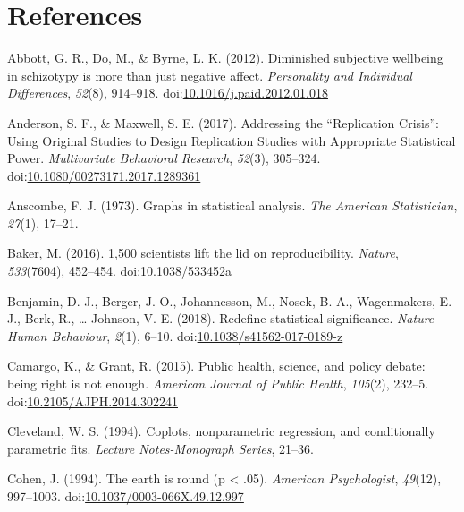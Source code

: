 \documentclass[
  doc]{apa6}
\begin{document}
\hypertarget{references}{%
\section{References}\label{references}}

\begingroup
\setlength{\parindent}{-0.5in}
\setlength{\leftskip}{0.5in}

\hypertarget{refs}{}
\leavevmode\hypertarget{ref-Abbott2012}{}%
Abbott, G. R., Do, M., \& Byrne, L. K. (2012). Diminished subjective wellbeing in schizotypy is more than just negative affect. \emph{Personality and Individual Differences}, \emph{52}(8), 914--918. doi:\href{https://doi.org/10.1016/j.paid.2012.01.018}{10.1016/j.paid.2012.01.018}

\leavevmode\hypertarget{ref-Anderson2017}{}%
Anderson, S. F., \& Maxwell, S. E. (2017). Addressing the ``Replication Crisis'': Using Original Studies to Design Replication Studies with Appropriate Statistical Power. \emph{Multivariate Behavioral Research}, \emph{52}(3), 305--324. doi:\href{https://doi.org/10.1080/00273171.2017.1289361}{10.1080/00273171.2017.1289361}

\leavevmode\hypertarget{ref-anscombe1973graphs}{}%
Anscombe, F. J. (1973). Graphs in statistical analysis. \emph{The American Statistician}, \emph{27}(1), 17--21.

\leavevmode\hypertarget{ref-Baker2016a}{}%
Baker, M. (2016). 1,500 scientists lift the lid on reproducibility. \emph{Nature}, \emph{533}(7604), 452--454. doi:\href{https://doi.org/10.1038/533452a}{10.1038/533452a}

\leavevmode\hypertarget{ref-Benjamin2018}{}%
Benjamin, D. J., Berger, J. O., Johannesson, M., Nosek, B. A., Wagenmakers, E.-J., Berk, R., \ldots{} Johnson, V. E. (2018). Redefine statistical significance. \emph{Nature Human Behaviour}, \emph{2}(1), 6--10. doi:\href{https://doi.org/10.1038/s41562-017-0189-z}{10.1038/s41562-017-0189-z}

\leavevmode\hypertarget{ref-Camargo2015}{}%
Camargo, K., \& Grant, R. (2015). Public health, science, and policy debate: being right is not enough. \emph{American Journal of Public Health}, \emph{105}(2), 232--5. doi:\href{https://doi.org/10.2105/AJPH.2014.302241}{10.2105/AJPH.2014.302241}

\leavevmode\hypertarget{ref-Cleveland1994}{}%
Cleveland, W. S. (1994). Coplots, nonparametric regression, and conditionally parametric fits. \emph{Lecture Notes-Monograph Series}, 21--36.

\leavevmode\hypertarget{ref-cohen_earth_1994}{}%
Cohen, J. (1994). The earth is round (p \textless{} .05). \emph{American Psychologist}, \emph{49}(12), 997--1003. doi:\href{https://doi.org/10.1037/0003-066X.49.12.997}{10.1037/0003-066X.49.12.997}
\end{document}

